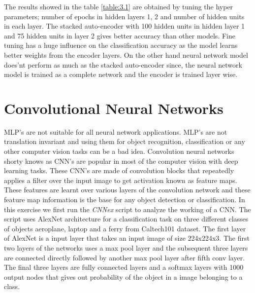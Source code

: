 The results showed in the table \ref{table:3.1} are obtained by tuning the hyper parameters; number of epochs in hidden layers 1, 2 and number of hidden units in each layer. The stacked auto-encoder with 100 hidden units in hidden layer 1  and 75 hidden units in layer 2 gives better accuracy than other models. Fine tuning has a huge influence on the classification accuracy as the model learns better weights from the encoder layers. On the other hand neural network model does'nt perform as much as the stacked auto-encoder since, the neural network model is trained as a complete network and the encoder is trained layer wise.
\section{Convolutional Neural Networks}
MLP's are not suitable for all neural network applications. MLP's are not translation invariant and using them for object  recognition, classification or any other computer vision tasks can be a bad idea. Convolution neural networks shorty knows as CNN's are popular in most of the computer vision with deep learning tasks. These CNN's are made of convolution blocks that repeatedly applies a filter over the input image to get activation known as feature maps. These features are learnt over various layers of the convolution network and these feature map information is the base for any object detection or classification. In this exercise we first run the \textit{CNNex} script to analyze the working of a CNN. The script uses AlexNet architecture for a classification task on three different classes of objects aeroplane, laptop and a ferry from Caltech101 dataset. The first layer of AlexNet is a input layer that takes an input image of size 224x224x3. The first two layers of the networks uses a max pool layer and the subsequent three layers are connected directly followed by another max pool layer after fifth conv layer. The final three layers are fully connected layers and a softmax layers with 1000 output nodes that gives out probability of the object in a image belonging to a class.

